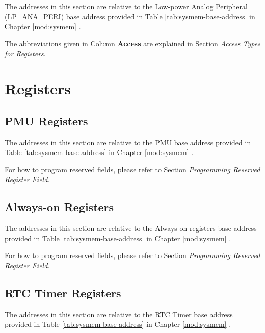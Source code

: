 \documentclass[main\_\_EN.tex]{subfiles}
\begin{document}
The addresses in this section are relative to the Low-power Analog Peripheral (LP\_ANA\_PERI) base address provided in Table \ref{tab:sysmem-base-address} in Chapter \ref{mod:sysmem} \textit{}.

The abbreviations given in Column \textbf{Access} are explained in Section \hyperref[glossary-access-types]{\textit{Access Types for Registers}}.




\clearpage
\section{Registers}

\subsection{PMU Registers}

The addresses in this section are relative to the PMU base address provided in Table \ref{tab:sysmem-base-address} in Chapter \ref{mod:sysmem} \textit{}.

For how to program reserved fields, please refer to Section \hyperref[programming-reserved-field]{\textit{Programming Reserved Register Field}}.



\subsection{Always-on Registers}

The addresses in this section are relative to the Always-on registers base address provided in Table \ref{tab:sysmem-base-address} in Chapter \ref{mod:sysmem} \textit{}.

For how to program reserved fields, please refer to Section \hyperref[programming-reserved-field]{\textit{Programming Reserved Register Field}}.



\subsection{RTC Timer Registers}

The addresses in this section are relative to the RTC Timer base address provided in Table \ref{tab:sysmem-base-address} in Chapter \ref{mod:sysmem} \textit{}.
\end{document}
